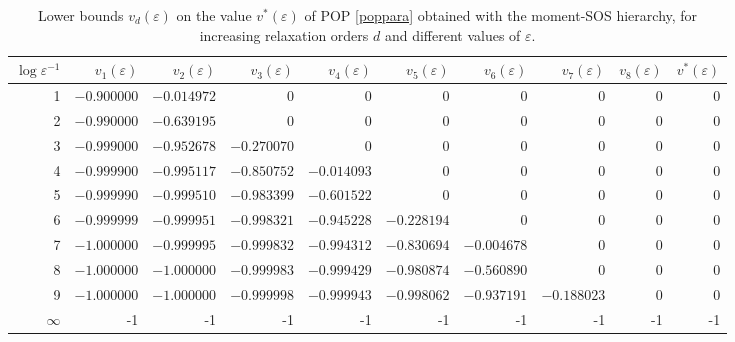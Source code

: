 \documentclass[a4paper,12pt]{article}
\begin{document}

\begin{table}
\scriptsize
{
\hspace*{-0.8cm}
\begin{tabular}{r|rrrrrrrr|r}
$\log \varepsilon^{-1}$ & $v_1(\varepsilon)$ & $v_2(\varepsilon)$ & $v_3(\varepsilon)$ & $v_4(\varepsilon)$ & $v_5(\varepsilon)$ & $v_6(\varepsilon)$ & $v_7(\varepsilon)$ & $v_8(\varepsilon)$ & $v^*(\varepsilon)$\\ 
\hline
1 & $-0.900000$ & $-0.014972$ & 0 & 0 & 0 & 0 & 0 & 0  & 0\\
2 & $-0.990000$ & $-0.639195$ & 0 & 0 & 0 & 0 & 0 & 0 & 0\\
3 & $-0.999000$ & $-0.952678$ & $-0.270070$ & 0 & 0 & 0 & 0 & 0 & 0\\
4 & $-0.999900$ & $-0.995117$ & $-0.850752$ & $-0.014093$ & 0 & 0 & 0 & 0 & 0\\
5 & $-0.999990$ & $-0.999510$ & $-0.983399$ & $-0.601522$ & 0 & 0 & 0 & 0 & 0\\
6 & $-0.999999$ & $-0.999951$ & $-0.998321$ & $-0.945228$ & $-0.228194$ & 0 & 0 & 0 & 0\\
7 & $-1.000000$ & $-0.999995$ & $-0.999832$ & $-0.994312$ & $-0.830694$ & $-0.004678$ & 0 & 0 & 0 \\
8 & $-1.000000$ & $-1.000000$ & $-0.999983$ & $-0.999429$ & $-0.980874$  & $-0.560890$ & 0 & 0 & 0\\
9 & $-1.000000$ & $-1.000000$ & $-0.999998$ & $-0.999943$ & $-0.998062$ & $-0.937191$ & $-0.188023$ & 0 & 0\\
$\infty$ & -1 & -1 & -1 & -1 & -1 & -1 & -1 & -1 & -1
\end{tabular}
}
\caption{Lower bounds $v_d(\varepsilon)$ on the value $v^*(\varepsilon)$ of POP \eqref{poppara} obtained with the moment-SOS hierarchy, for increasing relaxation orders $d$ and different values of $\varepsilon$.}
\label{tab:poppara}
\end{table}
%
\end{document}
